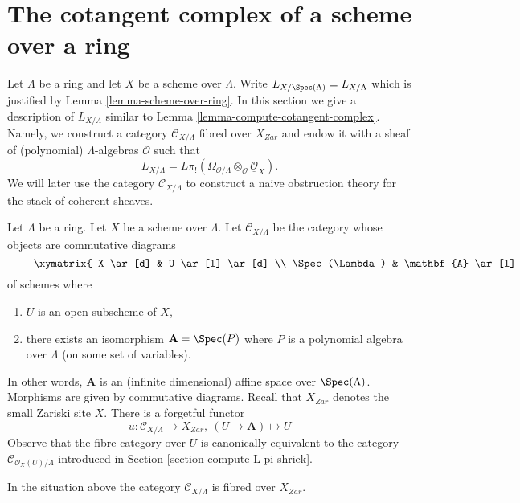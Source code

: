 \section{The cotangent complex of a scheme over a ring}
\label{section-cotangent-schemes-variant}

\noindent
Let $\Lambda$ be a ring and let $X$ be a scheme over $\Lambda$.
Write $L_{X/\Spec(\Lambda)} = L_{X/\Lambda}$ which is justified
by Lemma \ref{lemma-scheme-over-ring}.
In this section we give a description of $L_{X/\Lambda}$ similar to
Lemma \ref{lemma-compute-cotangent-complex}.
Namely, we construct a category $\mathcal{C}_{X/\Lambda}$
fibred over $X_{Zar}$ and endow it with a sheaf of (polynomial)
$\Lambda$-algebras $\mathcal{O}$ such that
$$
L_{X/\Lambda} =
L\pi_!(\Omega_{\mathcal{O}/\underline{\Lambda}} \otimes_\mathcal{O}
\underline{\mathcal{O}}_X).
$$
We will later use the category $\mathcal{C}_{X/\Lambda}$ to construct
a naive obstruction theory for the stack of coherent sheaves.

\medskip\noindent
Let $\Lambda$ be a ring. Let $X$ be a scheme over $\Lambda$.
Let $\mathcal{C}_{X/\Lambda}$ be the category whose objects are
commutative diagrams
\begin{equation}
\label{equation-object}
\vcenter{
\xymatrix{
X \ar[d] & U \ar[l] \ar[d] \\
\Spec(\Lambda) & \mathbf{A} \ar[l]
}
}
\end{equation}
of schemes where
\begin{enumerate}
\item $U$ is an open subscheme of $X$,
\item there exists an isomorphism $\mathbf{A} = \Spec(P)$
where $P$ is a polynomial algebra over $\Lambda$ (on some set
of variables).
\end{enumerate}
In other words, $\mathbf{A}$ is an (infinite dimensional) affine space over
$\Spec(\Lambda)$. Morphisms are given by commutative diagrams.
Recall that $X_{Zar}$ denotes the small Zariski site $X$.
There is a forgetful functor
$$
u : \mathcal{C}_{X/\Lambda} \to X_{Zar},\ (U \to \mathbf{A}) \mapsto U
$$
Observe that the fibre category over $U$ is canonically equivalent
to the category $\mathcal{C}_{\mathcal{O}_X(U)/\Lambda}$ introduced
in Section \ref{section-compute-L-pi-shriek}.

\begin{lemma}
\label{lemma-category-fibred}
In the situation above the category
$\mathcal{C}_{X/\Lambda}$ is fibred over $X_{Zar}$.
\end{lemma}

